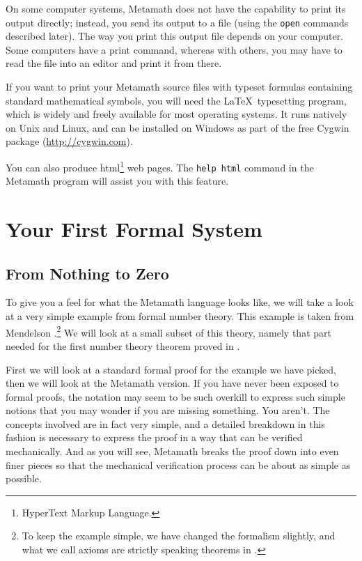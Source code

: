 On some computer systems, Metamath does not have the capability to print
its output directly; instead, you send its output to a file (using the
\texttt{open} commands described later).  The way you print this output
file depends on your computer. Some computers have a
print command, whereas with others, you may have to read the file into
an editor and print it from there.

If you want to print your Metamath source files with typeset formulas
containing standard mathematical symbols, you will need the \LaTeX\
typesetting program, which is widely and freely
available for most operating systems.  It runs natively on Unix and
Linux, and can be installed on Windows as part of the free Cygwin
package (\url{http://cygwin.com}).

You can also produce {\sc html}\footnote{HyperText Markup Language.}
web pages.  The {\tt help html} command in the Metamath program will
assist you with this feature.

\section{Your First Formal System}\label{start}
\subsection{From Nothing to Zero}\label{startf}

To give you a feel for what the Metamath language looks like,
we will take a look at a very simple example from formal number
theory.  This example is taken from
Mendelson \cite[p. 123]{Mendelson}.\footnote{To keep
the example simple, we have changed the formalism slightly, and what we call
axioms\index{axiom} are strictly speaking theorems\index{theorem} in
\cite{Mendelson}.}  We will look at a small subset of this theory, namely that
part needed for the first number theory theorem proved in \cite{Mendelson}.

First we will look at a standard formal proof for the
example we have picked, then we will look at the Metamath version.  If you
have never been exposed to formal proofs, the notation may seem to be such
overkill to express such simple notions that you may wonder if you are missing
something.  You aren't.  The concepts involved are in fact very simple, and a
detailed breakdown in this fashion is necessary to express the proof in a way
that can be verified mechanically.  And as you will see, Metamath breaks the
proof down into even finer pieces so that the mechanical verification process
can be about as simple as possible.

